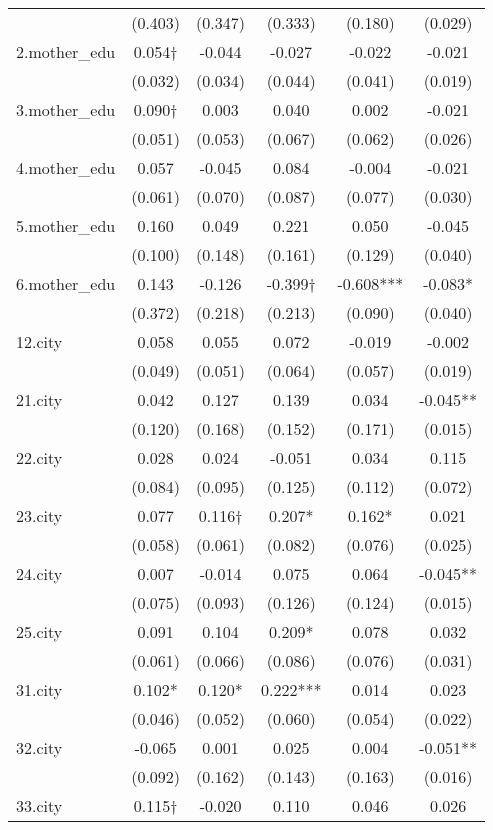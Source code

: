 \documentclass[]{article}
\begin{document}
\begin{tabular}{lccccc}
 & (0.403) & (0.347) & (0.333) & (0.180) & (0.029) \\
2.mother\_edu & 0.054† & -0.044 & -0.027 & -0.022 & -0.021 \\
 & (0.032) & (0.034) & (0.044) & (0.041) & (0.019) \\
3.mother\_edu & 0.090† & 0.003 & 0.040 & 0.002 & -0.021 \\
 & (0.051) & (0.053) & (0.067) & (0.062) & (0.026) \\
4.mother\_edu & 0.057 & -0.045 & 0.084 & -0.004 & -0.021 \\
 & (0.061) & (0.070) & (0.087) & (0.077) & (0.030) \\
5.mother\_edu & 0.160 & 0.049 & 0.221 & 0.050 & -0.045 \\
 & (0.100) & (0.148) & (0.161) & (0.129) & (0.040) \\
6.mother\_edu & 0.143 & -0.126 & -0.399† & -0.608*** & -0.083* \\
 & (0.372) & (0.218) & (0.213) & (0.090) & (0.040) \\
12.city & 0.058 & 0.055 & 0.072 & -0.019 & -0.002 \\
 & (0.049) & (0.051) & (0.064) & (0.057) & (0.019) \\
21.city & 0.042 & 0.127 & 0.139 & 0.034 & -0.045** \\
 & (0.120) & (0.168) & (0.152) & (0.171) & (0.015) \\
22.city & 0.028 & 0.024 & -0.051 & 0.034 & 0.115 \\
 & (0.084) & (0.095) & (0.125) & (0.112) & (0.072) \\
23.city & 0.077 & 0.116† & 0.207* & 0.162* & 0.021 \\
 & (0.058) & (0.061) & (0.082) & (0.076) & (0.025) \\
24.city & 0.007 & -0.014 & 0.075 & 0.064 & -0.045** \\
 & (0.075) & (0.093) & (0.126) & (0.124) & (0.015) \\
25.city & 0.091 & 0.104 & 0.209* & 0.078 & 0.032 \\
 & (0.061) & (0.066) & (0.086) & (0.076) & (0.031) \\
31.city & 0.102* & 0.120* & 0.222*** & 0.014 & 0.023 \\
 & (0.046) & (0.052) & (0.060) & (0.054) & (0.022) \\
32.city & -0.065 & 0.001 & 0.025 & 0.004 & -0.051** \\
 & (0.092) & (0.162) & (0.143) & (0.163) & (0.016) \\
33.city & 0.115† & -0.020 & 0.110 & 0.046 & 0.026 \\

\end{tabular}
\end{document}
